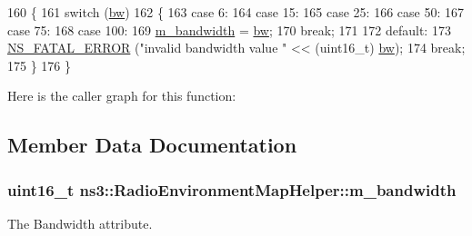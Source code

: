 \begin{DoxyCode}
160 \{
161   \textcolor{keywordflow}{switch} (\hyperlink{generate__test__data__lte__spectrum__model_8m_a3f7228a3941f19f282647a09dd494528}{bw})
162     \{ 
163     \textcolor{keywordflow}{case} 6:
164     \textcolor{keywordflow}{case} 15:
165     \textcolor{keywordflow}{case} 25:
166     \textcolor{keywordflow}{case} 50:
167     \textcolor{keywordflow}{case} 75:
168     \textcolor{keywordflow}{case} 100:
169       \hyperlink{classns3_1_1RadioEnvironmentMapHelper_ad93e4ceadf18b1eaf3a8399439ca6a25}{m\_bandwidth} = \hyperlink{generate__test__data__lte__spectrum__model_8m_a3f7228a3941f19f282647a09dd494528}{bw};
170       \textcolor{keywordflow}{break};
171 
172     \textcolor{keywordflow}{default}:
173       \hyperlink{group__fatal_ga5131d5e3f75d7d4cbfd706ac456fdc85}{NS\_FATAL\_ERROR} (\textcolor{stringliteral}{"invalid bandwidth value "} << (uint16\_t) \hyperlink{generate__test__data__lte__spectrum__model_8m_a3f7228a3941f19f282647a09dd494528}{bw});
174       \textcolor{keywordflow}{break};
175     \}
176 \}
\end{DoxyCode}


Here is the caller graph for this function\+:




\subsection{Member Data Documentation}
\subsubsection[{\texorpdfstring{m\+\_\+bandwidth}{m_bandwidth}}]{\setlength{\rightskip}{0pt plus 5cm}uint16\+\_\+t ns3\+::\+Radio\+Environment\+Map\+Helper\+::m\+\_\+bandwidth\hspace{0.3cm}{\ttfamily [private]}}\hypertarget{classns3_1_1RadioEnvironmentMapHelper_ad93e4ceadf18b1eaf3a8399439ca6a25}{}\label{classns3_1_1RadioEnvironmentMapHelper_ad93e4ceadf18b1eaf3a8399439ca6a25}


The {\ttfamily Bandwidth} attribute. 

